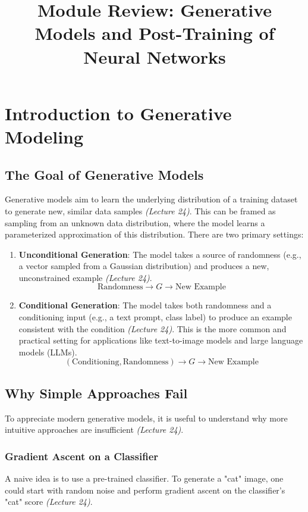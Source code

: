 \documentclass[11pt]{article}
\title{Module Review: Generative Models and Post-Training of Neural Networks}
\author{}
\date{}
\begin{document}
\maketitle

\section{Introduction to Generative Modeling}

\subsection{The Goal of Generative Models}
Generative models aim to learn the underlying distribution of a training dataset to generate new, similar data samples \textit{(Lecture 24)}. This can be framed as sampling from an unknown data distribution, where the model learns a parameterized approximation of this distribution. There are two primary settings:
\begin{enumerate}
    \item \textbf{Unconditional Generation}: The model takes a source of randomness (e.g., a vector sampled from a Gaussian distribution) and produces a new, unconstrained example \textit{(Lecture 24)}. 
    \[ \text{Randomness} \rightarrow G \rightarrow \text{New Example} \]
    \item \textbf{Conditional Generation}: The model takes both randomness and a conditioning input (e.g., a text prompt, class label) to produce an example consistent with the condition \textit{(Lecture 24)}. This is the more common and practical setting for applications like text-to-image models and large language models (LLMs).
    \[ (\text{Conditioning}, \text{Randomness}) \rightarrow G \rightarrow \text{New Example} \]
\end{enumerate}

\subsection{Why Simple Approaches Fail}
To appreciate modern generative models, it is useful to understand why more intuitive approaches are insufficient \textit{(Lecture 24)}.

\subsubsection{Gradient Ascent on a Classifier}
A naive idea is to use a pre-trained classifier. To generate a "cat" image, one could start with random noise and perform gradient ascent on the classifier's "cat" score \textit{(Lecture 24)}.
\end{document}

